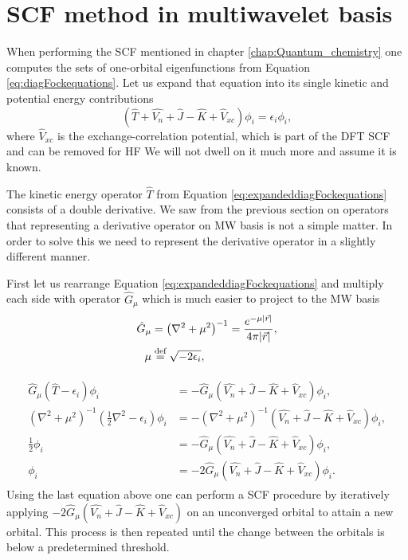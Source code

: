 \documentclass[../Thesis.tex]{subfiles}
\begin{document}
\section{\ac{SCF} method in multiwavelet basis}
When performing the \ac{SCF} mentioned in chapter \ref{chap:Quantum_chemistry} one
computes the sets of one-orbital eigenfunctions from Equation \ref{eq:diagFockequations}.
Let us expand that equation into its single kinetic and potential energy contributions
\begin{equation}\label{eq:expandeddiagFockequations}
  \left(\hat{T} + \hat{V_n} + \hat{J} - \hat{K} + \hat{V}_{xc}\right)\phi_i = \epsilon_i\phi_i,
\end{equation}
where $\hat{V}_{xc}$ is the exchange-correlation potential, which is part of the
\ac{DFT} \ac{SCF} and can be removed for \ac{HF}
We will not dwell on it much more and assume it is known.

The kinetic energy operator $\hat{T}$ from Equation \ref{eq:expandeddiagFockequations}
consists of a double derivative. We saw from the previous section on operators
that representing a derivative operator on \ac{MW} basis is not a simple matter.
In order to solve this we need to represent the derivative operator in a slightly
different manner.

First let us rearrange Equation \ref{eq:expandeddiagFockequations} and multiply each
side with operator $\hat{G}_\mu$ which is much easier to project to the \ac{MW}
basis
\begin{align}
  \hat{G}_\mu &=\left(\nabla^2 + \mu^2\right)^{-1} = \frac{e^{-\mu|\vec{r}|}}{4\pi|\vec{r}|}, \\
  \mu &\stackrel{\text{def}}{=} \sqrt{-2\epsilon_i},
\end{align}

\begin{align}
  \begin{split}
    \hat{G}_\mu\left(\hat{T} - \epsilon_i\right)\phi_i &= -\hat{G}_\mu\left(\hat{V_n} + \hat{J} - \hat{K} + \hat{V}_{xc}\right)\phi_i,\\
    \left(\nabla^2 + \mu^2\right)^{-1}\left(\frac{1}{2}\nabla^2 - \epsilon_i\right)\phi_i &= -\left(\nabla^2 + \mu^2\right)^{-1}\left(\hat{V_n} + \hat{J} - \hat{K} + \hat{V}_{xc}\right)\phi_i,\\
    \frac{1}{2}\phi_i &= -\hat{G}_\mu\left(\hat{V_n} + \hat{J} - \hat{K} + \hat{V}_{xc}\right)\phi_i,\\
    \phi_i &= -2\hat{G}_\mu\left(\hat{V_n} + \hat{J} - \hat{K} + \hat{V}_{xc}\right)\phi_i.
  \end{split}
\end{align}
Using the last equation above one can perform a \ac{SCF} procedure by iteratively applying
$-2\hat{G}_\mu\left(\hat{V_n} + \hat{J} - \hat{K} + \hat{V}_{xc}\right)$ on an
unconverged orbital to attain a new orbital. This process is then repeated until
the change between the orbitals is below a predetermined threshold.


\biblio
\end{document}
